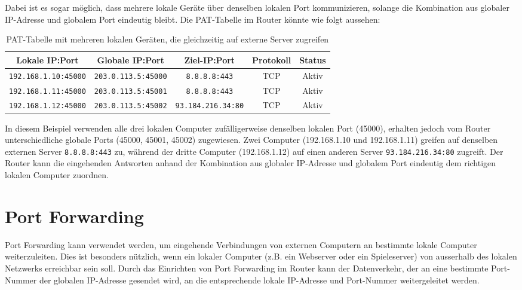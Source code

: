 Dabei ist es sogar möglich, dass mehrere lokale Geräte über denselben lokalen Port kommunizieren, solange die Kombination aus globaler \gls{IP}-Adresse und globalem Port eindeutig bleibt. Die \gls{PAT}-Tabelle im Router könnte wie folgt aussehen:

\begin{table}[H]
    \centering
    \begin{tabular}{c|c|c|c|c}
        \textbf{Lokale \gls{IP}:Port} & \textbf{Globale \gls{IP}:Port} & \textbf{Ziel-\gls{IP}:Port} & \textbf{Protokoll} & \textbf{Status} \\
        \midrule\midrule
        \texttt{192.168.1.10:45000} & \texttt{203.0.113.5:45000} & \texttt{8.8.8.8:443} & \gls{TCP} & Aktiv \\
        \midrule
        \texttt{192.168.1.11:45000} & \texttt{203.0.113.5:45001} & \texttt{8.8.8.8:443} & \gls{TCP} & Aktiv \\
        \midrule
        \texttt{192.168.1.12:45000} & \texttt{203.0.113.5:45002} & \texttt{93.184.216.34:80} & \gls{TCP} & Aktiv \\
    \end{tabular}
    \caption{\gls{PAT}-Tabelle mit mehreren lokalen Geräten, die gleichzeitig auf externe Server zugreifen}
\end{table}

In diesem Beispiel verwenden alle drei lokalen Computer zufälligerweise denselben lokalen Port (45000), erhalten jedoch vom Router unterschiedliche globale Ports (45000, 45001, 45002) zugewiesen. Zwei Computer (192.168.1.10 und 192.168.1.11) greifen auf denselben externen Server \texttt{8.8.8.8:443} zu, während der dritte Computer (192.168.1.12) auf einen anderen Server \texttt{93.184.216.34:80} zugreift. Der Router kann die eingehenden Antworten anhand der Kombination aus globaler \gls{IP}-Adresse und globalem Port eindeutig dem richtigen lokalen Computer zuordnen.

\section{Port Forwarding}
Port Forwarding kann verwendet werden, um eingehende Verbindungen von externen Computern an bestimmte lokale Computer weiterzuleiten. Dies ist besonders nützlich, wenn ein lokaler Computer (z.B. ein Webserver oder ein Spieleserver) von ausserhalb des lokalen Netzwerks erreichbar sein soll. Durch das Einrichten von Port Forwarding im Router kann der Datenverkehr, der an eine bestimmte Port-Nummer der globalen \gls{IP}-Adresse gesendet wird, an die entsprechende lokale \gls{IP}-Adresse und Port-Nummer weitergeleitet werden. 

